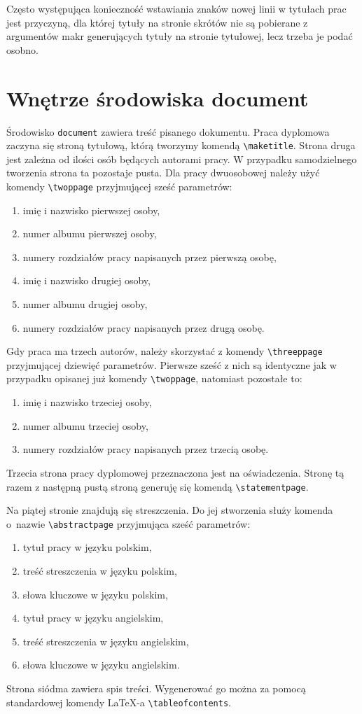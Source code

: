 \documentclass{SGGW-thesis}
\begin{document}
Często występująca konieczność wstawiania znaków nowej linii w tytułach prac jest przyczyną, dla której tytuły na stronie skrótów nie są pobierane z argumentów makr
generujących tytuły na stronie tytułowej, lecz trzeba je podać  osobno.


\section{Wnętrze środowiska document}
Środowisko \verb|document| zawiera treść pisanego dokumentu. Praca dyplomowa zaczyna się stroną tytułową, którą tworzymy komendą \verb|\maketitle|. Strona druga jest zależna
od ilości osób będących autorami pracy. W przypadku samodzielnego tworzenia strona ta pozostaje pusta. Dla pracy dwuosobowej należy użyć komendy \verb|\twoppage| przyjmującej
sześć parametrów:
\begin{enumerate}
\item{imię i nazwisko pierwszej osoby,}
\item{numer albumu pierwszej osoby,}
\item{numery rozdziałów pracy napisanych przez pierwszą osobę,}
\item{imię i nazwisko drugiej osoby,}
\item{numer albumu drugiej osoby,}
\item{numery rozdziałów pracy napisanych przez drugą osobę.}
\end{enumerate}
Gdy praca ma trzech autorów, należy skorzystać z komendy \verb|\threeppage| przyjmującej dziewięć parametrów. Pierwsze sześć z nich są identyczne jak w przypadku opisanej już
komendy \verb|\twoppage|, natomiast pozostałe to:
\begin{enumerate}\addtocounter{enumi}{6}
\item{imię i nazwisko trzeciej osoby,}
\item{numer albumu trzeciej osoby,}
\item{numery rozdziałów pracy napisanych przez trzecią osobę.}
\end{enumerate}
Trzecia strona pracy dyplomowej przeznaczona jest na oświadczenia. Stronę tą razem z następną pustą stroną generuję się komendą \verb|\statementpage|.

Na piątej stronie znajdują się streszczenia. Do jej stworzenia służy komenda o~nazwie \verb|\abstractpage| przyjmująca sześć parametrów:
\begin{enumerate}
\item{tytuł pracy w języku polskim,}
\item{treść streszczenia w języku polskim,}
\item{słowa kluczowe w języku polskim,}
\item{tytuł pracy w języku angielskim,}
\item{treść streszczenia w języku angielskim,}
\item{słowa kluczowe w języku angielskim.}
\end{enumerate}
Strona siódma zawiera spis treści. Wygenerować go można za pomocą standardowej komendy \LaTeX-a \verb|\tableofcontents|.
\end{document}

